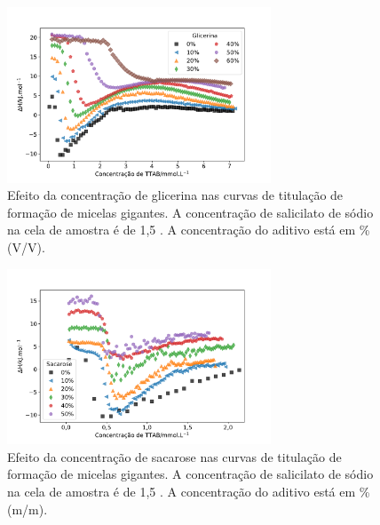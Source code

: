 			\begin{figure}[h]
				\centering
				\includegraphics[width=0.7\textwidth]{imagens/itc/ITC_MG_glic}
				\caption{Efeito da concentração de glicerina nas curvas de titulação de formação de micelas gigantes. A concentração de salicilato de sódio na cela de amostra é de 1,5 \mM. A concentração do aditivo está em \% (V/V).}
				\label{fig:itc_mg_glicerina}
			\end{figure}  
			
			\begin{figure}[h]
				\centering
				\includegraphics[width=0.7\textwidth]{imagens/itc/ITC_MG_sac}
				\caption{Efeito da concentração de sacarose nas curvas de titulação de formação de micelas gigantes. A concentração de salicilato de sódio na cela de amostra é de 1,5 \mM. A concentração do aditivo está em \% (m/m).}
				\label{fig:itc_mg_sacarose}
			\end{figure} 
			
